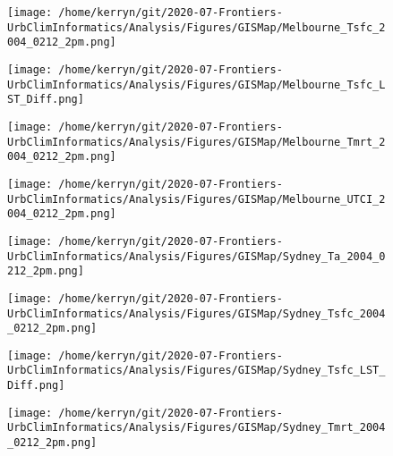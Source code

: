 \documentclass{article}
\begin{document}
\begin{figure}
\centering    
\texttt{[image: /home/kerryn/git/2020-07-Frontiers-UrbClimInformatics/Analysis/Figures/GISMap/Melbourne\_Tsfc\_2004\_0212\_2pm.png]}
\end{figure} 
\clearpage

\begin{figure}
\centering    
\texttt{[image: /home/kerryn/git/2020-07-Frontiers-UrbClimInformatics/Analysis/Figures/GISMap/Melbourne\_Tsfc\_LST\_Diff.png]}
\end{figure} 
\clearpage

\begin{figure}
\centering    
\texttt{[image: /home/kerryn/git/2020-07-Frontiers-UrbClimInformatics/Analysis/Figures/GISMap/Melbourne\_Tmrt\_2004\_0212\_2pm.png]}
\end{figure} 
\clearpage

\begin{figure}
\centering    
\texttt{[image: /home/kerryn/git/2020-07-Frontiers-UrbClimInformatics/Analysis/Figures/GISMap/Melbourne\_UTCI\_2004\_0212\_2pm.png]}
\end{figure} 
\clearpage





\begin{figure}
\centering    
\texttt{[image: /home/kerryn/git/2020-07-Frontiers-UrbClimInformatics/Analysis/Figures/GISMap/Sydney\_Ta\_2004\_0212\_2pm.png]}
\end{figure} 
\clearpage

\begin{figure}
\centering    
\texttt{[image: /home/kerryn/git/2020-07-Frontiers-UrbClimInformatics/Analysis/Figures/GISMap/Sydney\_Tsfc\_2004\_0212\_2pm.png]}
\end{figure} 
\clearpage

\begin{figure}
\centering    
\texttt{[image: /home/kerryn/git/2020-07-Frontiers-UrbClimInformatics/Analysis/Figures/GISMap/Sydney\_Tsfc\_LST\_Diff.png]}
\end{figure} 
\clearpage

\begin{figure}
\centering    
\texttt{[image: /home/kerryn/git/2020-07-Frontiers-UrbClimInformatics/Analysis/Figures/GISMap/Sydney\_Tmrt\_2004\_0212\_2pm.png]}
\end{figure} 
\clearpage
\end{document}
